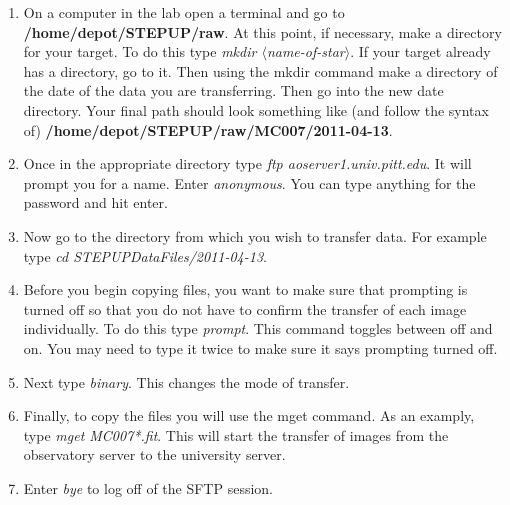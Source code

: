 \documentclass[10pt,preprint]{article}
\begin{document}
\begin{enumerate}

\item On a computer in the lab open a terminal and go to \textbf{/home/depot/STEPUP/raw}. At this point, if necessary, make a directory for your target. To do this type \emph{mkdir $\langle$name-of-star$\rangle$}. If your target already has a directory, go to it. Then using the mkdir command make a directory of the date of the data you are transferring. Then go into the new date directory. Your final path should look something like (and follow the syntax of) \textbf{/home/depot/STEPUP/raw/MC007/2011-04-13}.

\item Once in the appropriate directory type \emph{ftp aoserver1.univ.pitt.edu}. It will prompt you for a name. Enter \emph{anonymous}. You can type anything for the password and hit enter. 

\item Now go to the directory from which you wish to transfer data. For example type \emph{cd STEPUPDataFiles/2011-04-13}. 

\item Before you begin copying files, you want to make sure that prompting is turned off so that you do not have to confirm the transfer of each image individually. To do this type  \emph{prompt}. This command toggles between off and on. You may need to type it twice to make sure it says prompting turned off. 

\item Next type \emph{binary}. This changes the mode of transfer.

\item Finally, to copy the files you will use the mget command. As an examply, type \emph{mget MC007*.fit}. This will start the transfer of images from the observatory server to the university server. 

\item Enter \emph{bye} to log off of the SFTP session.
\end{enumerate}
\end{document}
